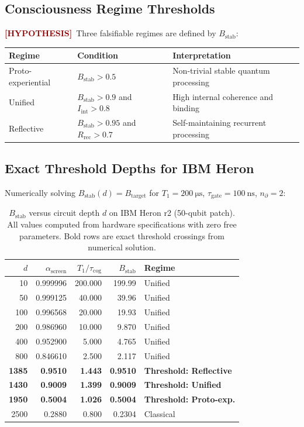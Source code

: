 \documentclass[12pt,a4paper]{article}
\newcommand{\HYP}{\textcolor{darkred}{\textbf{[HYPOTHESIS]}}}
\theoremstyle{monette}
\theoremstyle{definition}
\newcommand{\asc}{\alpha_{\mathrm{screen}}}
\newcommand{\Bstab}{B_{\mathrm{stab}}}
\newcommand{\tgate}{\tau_{\mathrm{gate}}}
\newcommand{\tcog}{\tau_{\mathrm{cog}}}
\newcommand{\nprt}{n_{\partial}}
\newcommand{\Tone}{T_1}
\begin{document}
\subsection{Consciousness Regime Thresholds}
\label{sec:thresholds}

\HYP\ Three falsifiable regimes are defined by $\Bstab$:
\begin{center}
\begin{tabular}{lll}
\toprule
\textbf{Regime} & \textbf{Condition} & \textbf{Interpretation} \\
\midrule
Proto-experiential & $\Bstab > 0.5$                & Non-trivial stable quantum processing \\
Unified            & $\Bstab > 0.9$ and $I_{\mathrm{int}} > 0.8$ & High internal coherence and binding \\
Reflective         & $\Bstab > 0.95$ and $R_{\mathrm{rec}} > 0.7$ & Self-maintaining recurrent processing \\
\bottomrule
\end{tabular}
\end{center}

\subsection{Exact Threshold Depths for IBM Heron}
\label{sec:dthresh}

Numerically solving $\Bstab(d) = B_{\mathrm{target}}$ for
$\Tone = \SI{200}{\micro\second}$, $\tgate = \SI{100}{\nano\second}$,
$\nprt = 2$:

\begin{table}[h!]
\centering
\caption{$\Bstab$ versus circuit depth $d$ on IBM Heron r2 (50-qubit patch).
All values computed from hardware specifications with zero free parameters.
Bold rows are exact threshold crossings from numerical solution.}
\label{tab:Bstab}
\begin{tabular}{rrrrp{3.5cm}}
\toprule
$d$ & $\asc$ & $\Tone/\tcog$ & $\Bstab$ & Regime \\
\midrule
10    & 0.999996 & 200.000 & 199.99 & Unified \\
50    & 0.999125 & 40.000  & 39.96  & Unified \\
100   & 0.996568 & 20.000  & 19.93  & Unified \\
200   & 0.986960 & 10.000  & 9.870  & Unified \\
400   & 0.952900 & 5.000   & 4.765  & Unified \\
800   & 0.846610 & 2.500   & 2.117  & Unified \\
\textbf{1385} & \textbf{0.9510} & \textbf{1.443} & \textbf{0.9510} & \textbf{Threshold: Reflective} \\
\textbf{1430} & \textbf{0.9009} & \textbf{1.399} & \textbf{0.9009} & \textbf{Threshold: Unified} \\
\textbf{1950} & \textbf{0.5004} & \textbf{1.026} & \textbf{0.5004} & \textbf{Threshold: Proto-exp.} \\
2500  & 0.2880 & 0.800 & 0.2304 & Classical \\
\bottomrule
\end{tabular}
\end{table}
\end{document}
